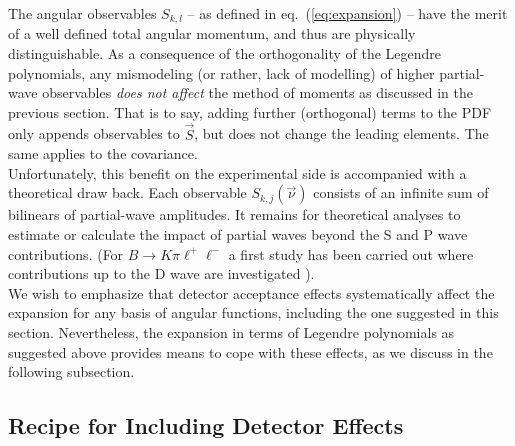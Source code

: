 \documentclass[aps,nofootinbib,preprintnumbers,prd,twocolumn]{revtex4-1}
\newcommand{\refeq}[1]{eq.~(\ref{eq:#1})}
\begin{document}
The angular observables $S_{k,l}$ -- as defined in \refeq{expansion} -- have
the merit of a well defined total angular momentum, and thus are physically
distinguishable.  As a consequence of the orthogonality of the Legendre
polynomials, any mismodeling (or rather, lack of modelling) of higher
partial-wave observables \emph{does not affect} the method of moments as
discussed in the previous section. That is to say, adding further (orthogonal) terms
to the PDF only appends observables to $\vec{S}$, but does not change the leading
elements. The same applies to the covariance.\\

Unfortunately, this benefit on the experimental side is accompanied with a
theoretical draw back. Each observable $S_{k,j}(\vec{\nu})$ consists of an
infinite sum of bilinears of partial-wave amplitudes. It remains for
theoretical analyses to estimate or calculate the impact of partial waves
beyond the S and P wave contributions.  (For $B\to K\pi\ell^+\ell^-$ a first
study has been carried out where contributions up to the D wave are
investigated \cite{Das:2014sra}).\\

We wish to emphasize that detector acceptance effects systematically affect the
expansion for any basis of angular functions, including the one suggested in
this section.  Nevertheless, the expansion in terms of Legendre polynomials as
suggested above provides means to cope with these effects, as we discuss in the
following subsection.


\subsection{Recipe for Including Detector Effects}
\label{sec:systematics:acceptance}
\end{document}
